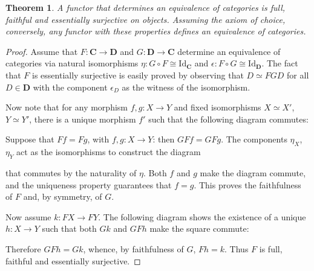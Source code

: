 \documentclass[a5paper,oneside,11pt]{article}
\newtheorem{thm}{Theorem}
\newcommand\Id{\mathord{\mathrm{Id}}}
\newcommand\1{\mathord{\mathrm{1}}}
\newcommand\cat[1]{\mathbf{#1}}
\begin{document}
\begin{thm}
    \label{thm:cateq}
    A functor that determines an equivalence of categories is full, faithful and
    essentially surjective on objects.
    Assuming the axiom of choice, conversely, any functor with these properties
    defines an equivalence of categories.
\end{thm}
\begin{proof}
    Assume that $F : \cat{C} \longrightarrow \cat{D}$ and $G : \cat{D} \longrightarrow \cat{C}$
    determine an equivalence of categories via natural isomorphisms $\eta : G \circ F \cong \Id_\cat{C}$
    and $\epsilon : F \circ G \cong \Id_\cat{D}$.
    The fact that $F$ is essentially surjective is easily proved by observing that $D \simeq FGD$
    for all $D \in \cat{D}$ with the component $\epsilon_D$ as the witness of the isomorphism.

    Now note that for any morphism $f, g : X \rightarrow Y$ and fixed isomorphisms $X \simeq X'$,
    $Y \simeq Y'$, there is a unique morphism $f'$ such that the following diagram commutes:
    \begin{figure}[H]
        \centering
    \end{figure}
    Suppose that $Ff = Fg$, with $f, g : X \rightarrow Y$: then $GFf = GFg$. The
    components $\eta_X$, $\eta_Y$ act as the isomorphisms to construct the
    diagram
    \begin{figure}[H]
        \centering
    \end{figure}
    that commutes by the naturality of $\eta$.
    Both $f$ and $g$ make the diagram commute, and the uniqueness property guarantees
    that $f = g$.
    This proves the faithfulness of $F$ and, by symmetry, of $G$.

    Now assume $k : FX \rightarrow FY$. The following diagram shows the existence
    of a unique $h : X \rightarrow Y$ such that both $Gk$ and $GFh$ make the square commute:
    \begin{figure}[H]
        \centering
    \end{figure}
    Therefore $GFh = Gk$, whence, by faithfulness of $G$, $Fh = k$.
    Thus $F$ is full, faithful and essentially surjective.


\end{proof}
\end{document}
